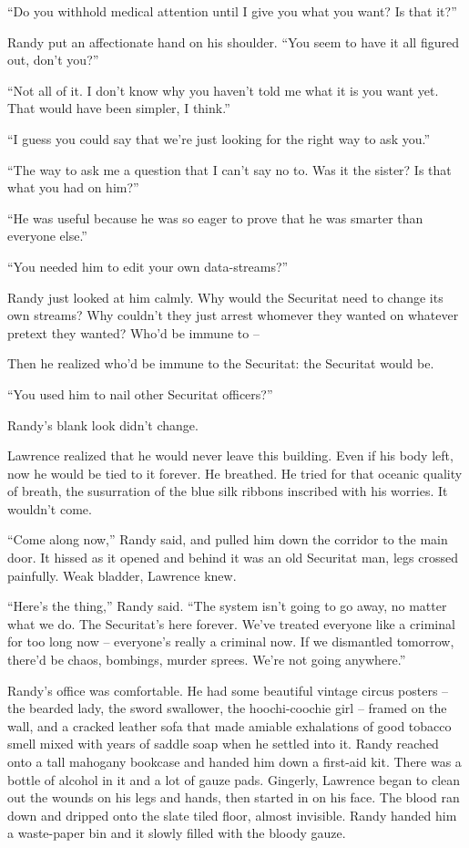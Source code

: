 “Do you withhold medical attention until I give you what you want? Is 
that it?”

Randy put an affectionate hand on his shoulder. “You seem to have it 
all figured out, don't you?”

“Not all of it. I don't know why you haven't told me what it is you 
want yet. That would have been simpler, I think.”

“I guess you could say that we're just looking for the right way to 
ask you.”

“The way to ask me a question that I can't say no to. Was it the 
sister? Is that what you had on him?”

“He was useful because he was so eager to prove that he was smarter 
than everyone else.”

“You needed him to edit your own data-streams?”

Randy just looked at him calmly. Why would the Securitat need to change 
its own streams? Why couldn't they just arrest whomever they wanted on 
whatever pretext they wanted? Who'd be immune to --

Then he realized who'd be immune to the Securitat: the Securitat would 
be.

“You used him to nail other Securitat officers?”

Randy's blank look didn't change.

Lawrence realized that he would never leave this building. Even if his 
body left, now he would be tied to it forever. He breathed. He tried 
for that oceanic quality of breath, the susurration of the blue silk 
ribbons inscribed with his worries. It wouldn't come.

“Come along now,” Randy said, and pulled him down the corridor to 
the main door. It hissed as it opened and behind it was an old 
Securitat man, legs crossed painfully. Weak bladder, Lawrence knew.

\tb

“Here's the thing,” Randy said. “The system isn't going to go 
away, no matter what we do. The Securitat's here forever. We've treated 
everyone like a criminal for too long now -- everyone's really a 
criminal now. If we dismantled tomorrow, there'd be chaos, bombings, 
murder sprees. We're not going anywhere.”

Randy's office was comfortable. He had some beautiful vintage circus 
posters -- the bearded lady, the sword swallower, the hoochi-coochie 
girl -- framed on the wall, and a cracked leather sofa that made 
amiable exhalations of good tobacco smell mixed with years of saddle 
soap when he settled into it. Randy reached onto a tall mahogany 
bookcase and handed him down a first-aid kit. There was a bottle of 
alcohol in it and a lot of gauze pads. Gingerly, Lawrence began to 
clean out the wounds on his legs and hands, then started in on his 
face. The blood ran down and dripped onto the slate tiled floor, almost 
invisible. Randy handed him a waste-paper bin and it slowly filled with 
the bloody gauze.


